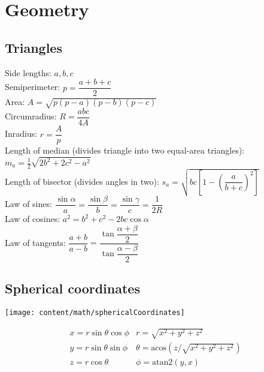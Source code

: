 \section{Geometry}

\subsection{Triangles}
Side lengths: $a,b,c$\\
Semiperimeter: $p=\dfrac{a+b+c}{2}$\\
Area: $A=\sqrt{p(p-a)(p-b)(p-c)}$\\
Circumradius: $R=\dfrac{abc}{4A}$\\
Inradius: $r=\dfrac{A}{p}$\\
Length of median (divides triangle into two equal-area triangles): $m_a=\tfrac{1}{2}\sqrt{2b^2+2c^2-a^2}$\\
Length of bisector (divides angles in two): $s_a=\sqrt{bc\left[1-\left(\dfrac{a}{b+c}\right)^2\right]}$\\
Law of sines: $\dfrac{\sin\alpha}{a}=\dfrac{\sin\beta}{b}=\dfrac{\sin\gamma}{c}=\dfrac{1}{2R}$\\
Law of cosines: $a^2=b^2+c^2-2bc\cos\alpha$\\
Law of tangents: $\dfrac{a+b}{a-b}=\dfrac{\tan\dfrac{\alpha+\beta}{2}}{\tan\dfrac{\alpha-\beta}{2}}$\\




\subsection{Spherical coordinates}
\begin{center}
\texttt{[image: content/math/sphericalCoordinates]}
\end{center}
\[\begin{array}{cc}
x = r\sin\theta\cos\phi & r = \sqrt{x^2+y^2+z^2}\\
y = r\sin\theta\sin\phi & \theta = \textrm{acos}(z/\sqrt{x^2+y^2+z^2})\\
z = r\cos\theta & \phi = \textrm{atan2}(y,x)
\end{array}\]

